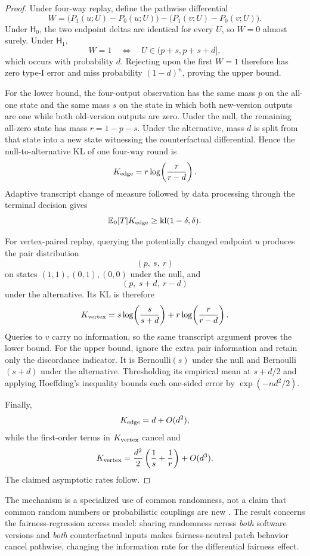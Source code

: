 \begin{proof}
Under four-way replay, define the pathwise differential
\[
W
=
\bigl(P_1(u;U)-P_0(u;U)\bigr)
-
\bigl(P_1(v;U)-P_0(v;U)\bigr).
\]
Under \(\mathsf H_0\), the two endpoint deltas are identical for every \(U\), so
\(W=0\) almost surely.  Under \(\mathsf H_1\),
\[
W=1
\quad\Longleftrightarrow\quad
U\in(p+s,p+s+d],
\]
which occurs with probability \(d\).  Rejecting upon the first \(W=1\) therefore
has zero type-I error and miss probability \((1-d)^n\), proving the upper bound.

For the lower bound, the four-output observation has the same mass \(p\) on the
all-one state and the same mass \(s\) on the state in which both new-version
outputs are one while both old-version outputs are zero.  Under the null, the
remaining all-zero state has mass \(r=1-p-s\).  Under the alternative, mass \(d\)
is split from that state into a new state witnessing the counterfactual
differential.  Hence the null-to-alternative KL of one four-way round is
\[
K_{\rm edge}
=
r\log\!\left(\frac{r}{r-d}\right).
\]
Adaptive transcript change of measure followed by data processing through the
terminal decision gives
\[
\mathbb{E}_0[T]K_{\rm edge}
\ge
\mathrm{kl}(1-\delta,\delta).
\]

For vertex-paired replay, querying the potentially changed endpoint \(u\) produces
the pair distribution
\[
(p,\ s,\ r)
\]
on states \((1,1),(0,1),(0,0)\) under the null, and
\[
(p,\ s+d,\ r-d)
\]
under the alternative.  Its KL is therefore
\[
K_{\rm vertex}
=
s\log\!\left(\frac{s}{s+d}\right)
+
r\log\!\left(\frac{r}{r-d}\right).
\]
Queries to \(v\) carry no information, so the same transcript argument proves the
lower bound.  For the upper bound, ignore the extra pair information and retain
only the discordance indicator.  It is Bernoulli\((s)\) under the null and
Bernoulli\((s+d)\) under the alternative.  Thresholding its empirical mean at
\(s+d/2\) and applying Hoeffding's inequality bounds each one-sided error by
\(\exp(-nd^2/2)\).

Finally,
\[
K_{\rm edge}
=
d+O(d^2),
\]
while the first-order terms in \(K_{\rm vertex}\) cancel and
\[
K_{\rm vertex}
=
\frac{d^2}{2}
\left(
\frac{1}{s}+\frac{1}{r}
\right)
+
O(d^3).
\]
The claimed asymptotic rates follow.
\end{proof}

The mechanism is a specialized use of common randomness, not a claim that common
random numbers or probabilistic couplings are new
\cite{GlassermanYao1992,BartheEtAl2017}.  The result concerns the
fairness-regression access model: sharing randomness across \emph{both} software
versions and \emph{both} counterfactual inputs makes fairness-neutral patch
behavior cancel pathwise, changing the information rate for the differential
fairness effect.




